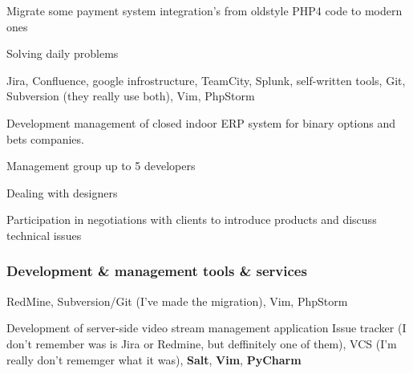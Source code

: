 \documentclass{cv}
\begin{document}
    \begin{gaas}
      \item Migrate some payment system integration's from oldstyle PHP4 code
        to modern ones
      \item Solving daily problems
    \end{gaas}
    \devtools
      Jira, Confluence, google infrostructure, TeamCity, Splunk, self-written
      tools, Git, Subversion (they really use both), Vim, PhpStorm

    \begin{gaas}
      \item Development management of closed indoor ERP system for binary
        options and bets companies.
      \item Management group up to 5 developers
      \item Dealing with designers
      \item Participation in negotiations with clients to introduce products
        and discuss technical issues
    \end{gaas}
    \devtools
    \subsubsection* {Development \& management tools \& services}
      RedMine, Subversion/Git (I've made the migration), Vim, PhpStorm

    \gaa
      Development of server-side video stream management application
    \devtools
      Issue tracker (I don't remember was is Jira or Redmine, but deffinitely
      one of them), VCS (I'm really don't rememger what it was), \textbf{Salt},
      \textbf{Vim}, \textbf{PyCharm}
  \pagebreak
\end{document}
